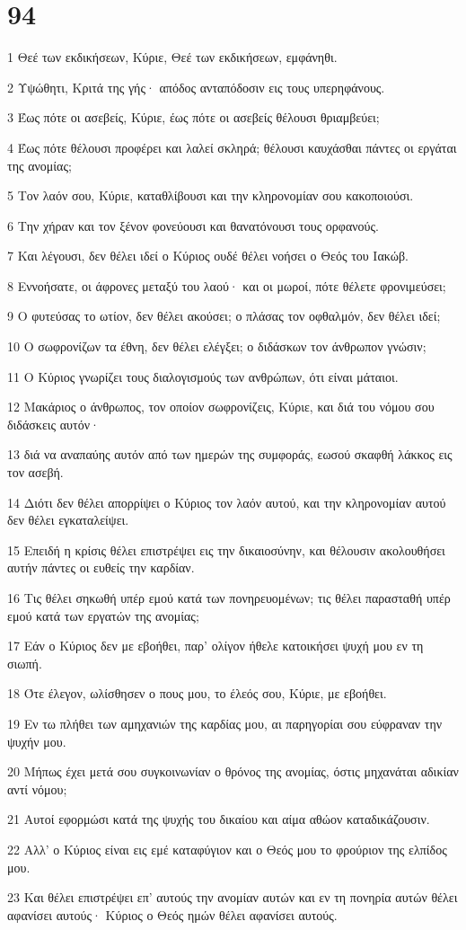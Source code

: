 \chapter{94}

\par 1 Θεέ των εκδικήσεων, Κύριε, Θεέ των εκδικήσεων, εμφάνηθι.
\par 2 Υψώθητι, Κριτά της γής· απόδος ανταπόδοσιν εις τους υπερηφάνους.
\par 3 Έως πότε οι ασεβείς, Κύριε, έως πότε οι ασεβείς θέλουσι θριαμβεύει;
\par 4 Έως πότε θέλουσι προφέρει και λαλεί σκληρά; θέλουσι καυχάσθαι πάντες οι εργάται της ανομίας;
\par 5 Τον λαόν σου, Κύριε, καταθλίβουσι και την κληρονομίαν σου κακοποιούσι.
\par 6 Την χήραν και τον ξένον φονεύουσι και θανατόνουσι τους ορφανούς.
\par 7 Και λέγουσι, δεν θέλει ιδεί ο Κύριος ουδέ θέλει νοήσει ο Θεός του Ιακώβ.
\par 8 Εννοήσατε, οι άφρονες μεταξύ του λαού· και οι μωροί, πότε θέλετε φρονιμεύσει;
\par 9 Ο φυτεύσας το ωτίον, δεν θέλει ακούσει; ο πλάσας τον οφθαλμόν, δεν θέλει ιδεί;
\par 10 Ο σωφρονίζων τα έθνη, δεν θέλει ελέγξει; ο διδάσκων τον άνθρωπον γνώσιν;
\par 11 Ο Κύριος γνωρίζει τους διαλογισμούς των ανθρώπων, ότι είναι μάταιοι.
\par 12 Μακάριος ο άνθρωπος, τον οποίον σωφρονίζεις, Κύριε, και διά του νόμου σου διδάσκεις αυτόν·
\par 13 διά να αναπαύης αυτόν από των ημερών της συμφοράς, εωσού σκαφθή λάκκος εις τον ασεβή.
\par 14 Διότι δεν θέλει απορρίψει ο Κύριος τον λαόν αυτού, και την κληρονομίαν αυτού δεν θέλει εγκαταλείψει.
\par 15 Επειδή η κρίσις θέλει επιστρέψει εις την δικαιοσύνην, και θέλουσιν ακολουθήσει αυτήν πάντες οι ευθείς την καρδίαν.
\par 16 Τις θέλει σηκωθή υπέρ εμού κατά των πονηρευομένων; τις θέλει παρασταθή υπέρ εμού κατά των εργατών της ανομίας;
\par 17 Εάν ο Κύριος δεν με εβοήθει, παρ' ολίγον ήθελε κατοικήσει ψυχή μου εν τη σιωπή.
\par 18 Ότε έλεγον, ωλίσθησεν ο πους μου, το έλεός σου, Κύριε, με εβοήθει.
\par 19 Εν τω πλήθει των αμηχανιών της καρδίας μου, αι παρηγορίαι σου εύφραναν την ψυχήν μου.
\par 20 Μήπως έχει μετά σου συγκοινωνίαν ο θρόνος της ανομίας, όστις μηχανάται αδικίαν αντί νόμου;
\par 21 Αυτοί εφορμώσι κατά της ψυχής του δικαίου και αίμα αθώον καταδικάζουσιν.
\par 22 Αλλ' ο Κύριος είναι εις εμέ καταφύγιον και ο Θεός μου το φρούριον της ελπίδος μου.
\par 23 Και θέλει επιστρέψει επ' αυτούς την ανομίαν αυτών και εν τη πονηρία αυτών θέλει αφανίσει αυτούς· Κύριος ο Θεός ημών θέλει αφανίσει αυτούς.

